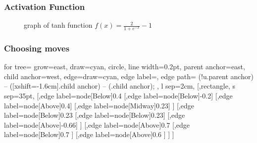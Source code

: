 \documentclass[aspectratio=169]{beamer}
\begin{document}
	\begin{frame}
		\frametitle{Activation Function}
		\begin{figure}
				\centering
			
				\caption{graph of tanh function $f(x)={\frac{2}{1+e^{-x}}- 1}$ \label{sigmoid}}
		\end{figure}
	\end{frame}



	\begin{frame}
		\frametitle{Choosing moves}

		\begin{forest} 
			for tree={
				grow=east,
				draw=cyan,
				circle,
				line width=0.2pt,
				parent anchor=east,
				child anchor=west,
				edge={draw=cyan},
				edge label={\Huge\color{black}},
				edge path={
					\noexpand{}
						(!u.parent anchor) -- ([xshift=-1.6cm].child anchor) --    
						(.child anchor)\forestoption{edge label};
				},
				l sep=2cm,
			} 
			[,rectangle, s sep=35pt,
				[,edge label={node[Below]{0.4}}
					[,edge label={node[Below]{-0.2}}]
					[,edge label={node[Above]{0.4}}]
					[,edge label={node[Midway]{0.23}}]
				]
				[,edge label={node[Below]{0.23}}
					[,edge label={node[Below]{0.23}}]
					[,edge label={node[Above]{-0.66}}]
				]
				[,edge label={node[Above]{0.7}}
					[,edge label={node[Below]{0.7}}
					]
					[,edge label={node[Above]{0.6}}
					]
				]
			]
			\end{forest}
	\end{frame}
\end{document}

